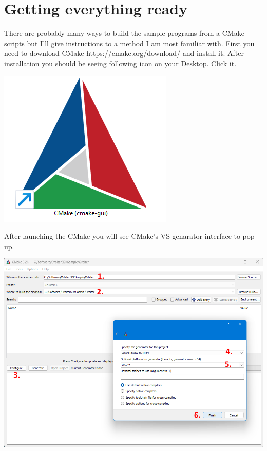 \documentclass[a4paper]{article}
\begin{document}
\maketitle

\section{Getting everything ready}
There are probably many ways to build the sample programs from a CMake scripts but I'll give instructions to a method I am most familiar with.
First you need to download CMake \href{https://cmake.org/download/}{https://cmake.org/download/} and install it. After installation you should be seeing following icon on your Desktop. Click it. 

\begin{center}
\includegraphics[width=0.15\linewidth]{assets/cmakeicon.png}
\end{center}

After launching the CMake you will see CMake's VS-genarator interface to pop-up.

\begin{center}
\includegraphics[width=1.0\linewidth]{assets/vsgen1.png}
\end{center}
\newpage
\end{document}
